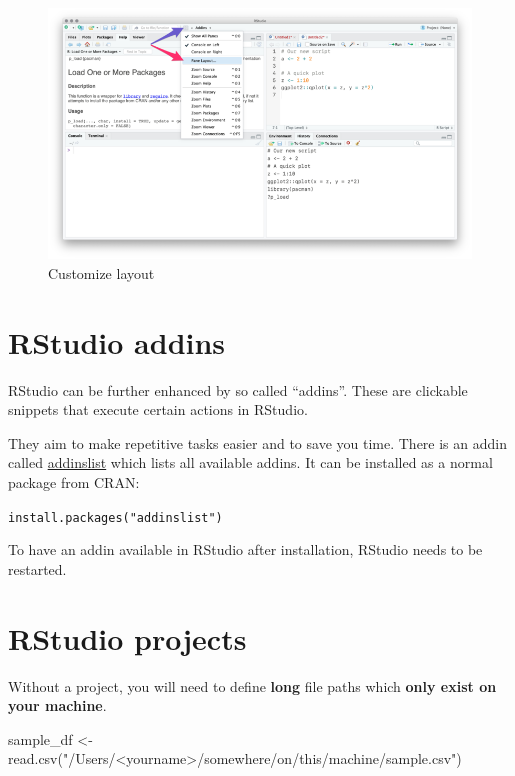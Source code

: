 \documentclass[]{book}
\newenvironment{Shaded}{}{}
\newcommand{\KeywordTok}[1]{\textcolor[rgb]{0.00,0.00,1.00}{#1}}
\newcommand{\NormalTok}[1]{#1}
\newcommand{\StringTok}[1]{\textcolor[rgb]{0.00,0.50,0.50}{#1}}
\begin{document}
\begin{figure}
\centering
\includegraphics{img/rstudio_layout.png}
\caption{Customize layout}
\end{figure}

\hypertarget{rstudio-addins}{%
\section{RStudio addins}\label{rstudio-addins}}

RStudio can be further enhanced by so called ``addins''.
These are clickable snippets that execute certain actions in RStudio.

They aim to make repetitive tasks easier and to save you time.
There is an addin called \href{https://github.com/daattali/addinslist}{addinslist} which lists all available addins.
It can be installed as a normal package from CRAN:

\texttt{install.packages("addinslist")}

To have an addin available in RStudio after installation, RStudio needs to be restarted.

\hypertarget{rstudio-projects}{%
\section{RStudio projects}\label{rstudio-projects}}

Without a project, you will need to define \textbf{long} file paths which \textbf{only exist on your machine}.

\begin{Shaded}
\begin{Highlighting}[]
\NormalTok{sample_df <-}\StringTok{ }\KeywordTok{read.csv}\NormalTok{(}\StringTok{"/Users/<yourname>/somewhere/on/this/machine/sample.csv"}\NormalTok{)}
\end{Highlighting}
\end{Shaded}
\end{document}
